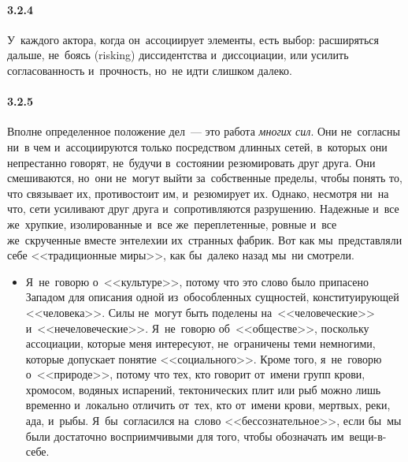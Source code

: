 \paragraph{3.2.4}\hypertarget{par:3.2.4}{} У~каждого актора, когда он~ассоциирует элементы, есть выбор: расширяться дальше, не~боясь (risking) диссидентства и~диссоциации, или усилить согласованность и~прочность, но~не идти слишком далеко. 

\paragraph{3.2.5}\hypertarget{par:3.2.5}{} Вполне определенное положение дел~--- это работа {\itshape многих сил}. Они не~согласны ни~в чем и~ассоциируются только посредством длинных сетей, в~которых они непрестанно говорят, не~будучи в~состоянии резюмировать друг друга. Они смешиваются, но~они не~могут выйти за~собственные пределы, чтобы понять то, что связывает их, противостоит им, и~резюмирует их. Однако, несмотря ни~на что, сети усиливают друг друга и~сопротивляются разрушению. Надежные и~все же~хрупкие, изолированные и~все же~переплетенные, ровные и~все же~скрученные вместе энтелехии их~странных фабрик. Вот как мы~представляли себе <<традиционные миры>>, как бы~далеко назад мы~ни смотрели. 
	\begin{itemize}
	\item 
 Я~не~говорю о~<<культуре>>, потому что это слово было припасено Западом для описания одной из~обособленных сущностей, конституирующей <<человека>>. Силы не~могут быть поделены на~<<человеческие>> и~<<нечеловеческие>>. Я~не~говорю об~<<обществе>>, поскольку ассоциации, которые меня интересуют, не~ограничены теми немногими, которые допускает понятие <<социального>>. Кроме того, я~не~говорю о~<<природе>>, потому что тех, кто говорит от~имени групп крови, хромосом, водяных испарений, тектонических плит или рыб можно лишь временно и~локально отличить от~тех, кто от~имени крови, мертвых, реки, ада, и~рыбы. Я~бы~согласился на~слово <<бессознательное>>, если бы~мы были достаточно восприимчивыми для того, чтобы обозначать им~вещи-в-себе.
	\end{itemize}

